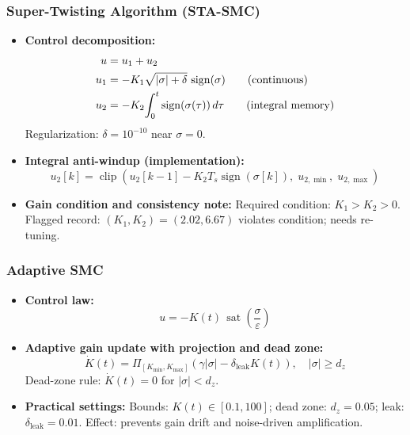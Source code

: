 \documentclass[10pt, a4paper]{article}
\newcommand{\sign}{\operatorname{sign}}
\newcommand{\sat}{\operatorname{sat}}
\begin{document}
\subsubsection{Super-Twisting Algorithm (STA-SMC)}

\begin{itemize}[leftmargin=1.5em,itemsep=0.2em]
  \item \textbf{Control decomposition:}
  \begin{align}
    u     &= u_1 + u_2 \label{eq:sta}\\
    u_1   &= -K_1\sqrt{|\sigma| + \delta}\,\sign(\sigma)
    \qquad \text{(continuous)} \notag\\
    u_2   &= -K_2\!\int_0^t \sign(\sigma(\tau))\,d\tau
    \qquad \text{(integral memory)} \notag
  \end{align}
  Regularization: $\delta=10^{-10}$ near $\sigma=0$.

  \item \textbf{Integral anti-windup (implementation):}
  \begin{equation}
    u_2[k] = \operatorname{clip}
    \left(u_2[k-1] - K_2T_s\sign(\sigma[k]),\;
    u_{2,\min},\;u_{2,\max}\right)
  \end{equation}

  \item \textbf{Gain condition and consistency note:}
  Required condition: $K_1 > K_2 > 0$.
  Flagged record: $(K_1,K_2)=(2.02,6.67)$ violates condition; needs re-tuning.
\end{itemize}

\subsubsection{Adaptive SMC}

\begin{itemize}[leftmargin=1.5em,itemsep=0.2em]
  \item \textbf{Control law:}
  \begin{equation}
    u = -K(t)\,\sat\!\left(\frac{\sigma}{\varepsilon}\right)
    \label{eq:adaptive}
  \end{equation}

  \item \textbf{Adaptive gain update with projection and dead zone:}
  \begin{equation}
    \dot{K}(t) = \Pi_{[K_\text{min},K_\text{max}]}
    \!\left(\gamma |\sigma| - \delta_\text{leak}K(t)\right),
    \quad |\sigma| \ge d_z
    \label{eq:adaptive_law}
  \end{equation}
  Dead-zone rule: $\dot{K}(t)=0$ for $|\sigma|<d_z$.

  \item \textbf{Practical settings:}
  Bounds: $K(t)\in[0.1,100]$; dead zone: $d_z=0.05$; leak: $\delta_\text{leak}=0.01$.
  Effect: prevents gain drift and noise-driven amplification.
\end{itemize}
\end{document}
